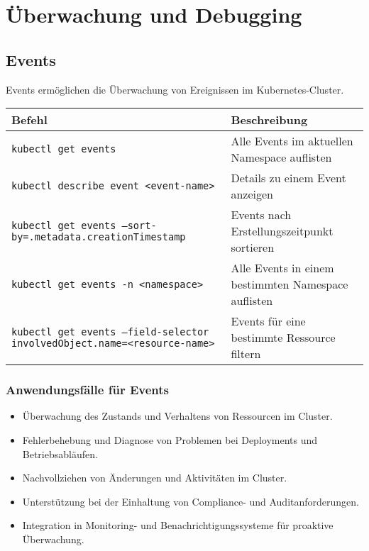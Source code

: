 \chapter{Überwachung und Debugging}

\section{Events}
Events ermöglichen die Überwachung von Ereignissen im Kubernetes-Cluster.\\

\noindent
\begin{tabular}{|p{}|p{}|}
\hline
\textbf{Befehl} & \textbf{Beschreibung} \\
\hline
\texttt{kubectl get events} & Alle Events im aktuellen Namespace auflisten \\
\texttt{kubectl describe event <event-name>} & Details zu einem Event anzeigen \\
\texttt{kubectl get events --sort-by=.metadata.creationTimestamp} & Events nach Erstellungszeitpunkt sortieren \\
\texttt{kubectl get events -n <namespace>} & Alle Events in einem bestimmten Namespace auflisten \\
\texttt{kubectl get events --field-selector involvedObject.name=<resource-name>} & Events für eine bestimmte Ressource filtern \\
\hline
\end{tabular}

\subsection{Anwendungsfälle für Events}
\begin{itemize}
    \item Überwachung des Zustands und Verhaltens von Ressourcen im Cluster.
    \item Fehlerbehebung und Diagnose von Problemen bei Deployments und Betriebsabläufen.
    \item Nachvollziehen von Änderungen und Aktivitäten im Cluster.
    \item Unterstützung bei der Einhaltung von Compliance- und Auditanforderungen.
    \item Integration in Monitoring- und Benachrichtigungssysteme für proaktive Überwachung.
\end{itemize}

